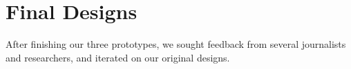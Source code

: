 \section{Final Designs}
After finishing our three prototypes, we sought feedback from several journalists and researchers, and iterated on our original designs. 



